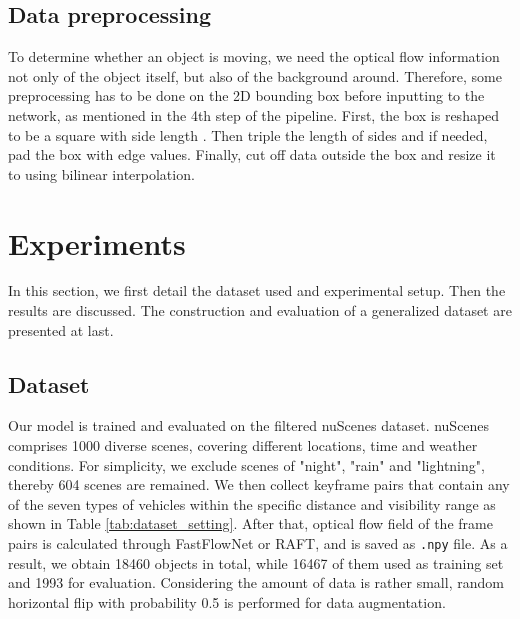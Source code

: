\documentclass[10pt, a4paper, twocolumn]{article}
\begin{document}
\subsection{\normalsize Data preprocessing}

    To determine whether an object is moving, we need the optical flow information not only of the object itself, but also of the background around. Therefore, some preprocessing has to be done on the 2D bounding box before inputting to the network, as mentioned in the 4th step of the pipeline. First, the box is reshaped to be a square with side length . Then triple the length of sides and if needed, pad the box with edge values. Finally, cut off data outside the box and resize it to  using bilinear interpolation.


\section{\large Experiments}

    In this section, we first detail the dataset used and experimental setup. Then the results are discussed. The construction and evaluation of a generalized dataset are presented at last.

\subsection{\normalsize Dataset}

    Our model is trained and evaluated on the filtered nuScenes \cite{nuscenes2019} dataset. nuScenes comprises 1000 diverse scenes, covering different locations, time and weather conditions. For simplicity, we exclude scenes of "night", "rain" and "lightning", thereby 604 scenes are remained. We then collect keyframe pairs that contain any of the seven types of vehicles within the specific distance and visibility range as shown in Table \ref{tab:dataset_setting}. After that, optical flow field of the frame pairs is calculated through FastFlowNet or RAFT, and is saved as \texttt{.npy} file. As a result, we obtain 18460 objects in total, while 16467 of them used as training set and 1993 for evaluation. Considering the amount of data is rather small, random horizontal flip with probability 0.5 is performed for data augmentation.
    
\end{document}
